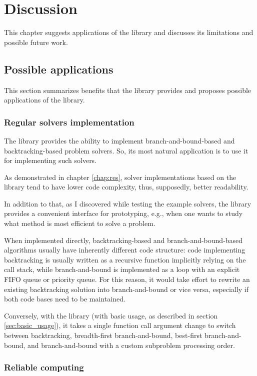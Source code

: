\chapter{Discussion}
\label{chap:discuss}

This chapter suggests applications of the library and discusses its limitations
and possible future work.

\section{Possible applications}

This section summarizes benefits that the library provides and proposes possible applications
of the library.

\subsection{Regular solvers implementation}

The library provides the ability to implement branch-and-bound-based and backtracking-based
problem solvers. So, its most natural application is to use it for implementing such solvers.

As demonstrated in chapter \ref{chap:res}, solver implementations based on the library
tend to have lower code complexity, thus, supposedly, better readability.

In addition to that, as I discovered while testing the example solvers,
the library provides a convenient interface for prototyping, e.g., when one wants to study
what method is most efficient to solve a problem.

When implemented directly,
backtracking-based and branch-and-bound-based algorithms usually have inherently different
code structure: code implementing backtracking is usually written as a recursive function
implicitly relying on the call stack, while branch-and-bound is implemented as a loop
with an explicit FIFO queue or priority queue. For this reason, it would take effort
to rewrite an existing backtracking solution into branch-and-bound or vice versa, especially
if both code bases need to be maintained.

Conversely, with the library (with basic usage, as described in section
\ref{sec:basic_usage}), it takes a single function call argument change to switch between
backtracking, breadth-first branch-and-bound, best-first branch-and-bound, and
branch-and-bound with a custom subproblem processing order.

\subsection{Reliable computing}

